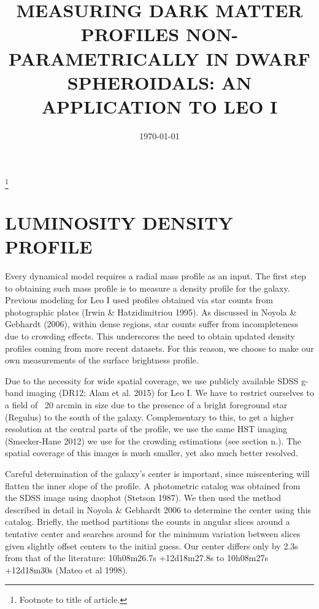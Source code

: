 \documentclass[%
 aip,
 twocolumn,
 jmp,%
 amsmath,amssymb,
 reprint,%
]{aastex61}
\begin{document}

\title[MEASURING DARK MATTER PROFILES NON-PARAMETRICALLY IN DWARF SPHEROIDALS]{MEASURING DARK MATTER PROFILES NON-PARAMETRICALLY IN DWARF SPHEROIDALS:
	AN APPLICATION TO LEO I}%
\thanks{Footnote to title of article.}


\date{\today}%



\section{LUMINOSITY DENSITY PROFILE}

Every dynamical model requires a radial mass profile as an input. The first step to obtaining such mass profile is to measure a density profile for the galaxy. Previous modeling for Leo I used profiles obtained via star counts from photographic plates (Irwin & Hatzidimitriou 1995). As discussed in Noyola \& Gebhardt (2006), within dense regions, star counts suffer from incompleteness due to crowding effects. This underscores the need to obtain updated density profiles coming from more recent datasets. For this reason, we choose to make our own measurements of the surface brightness profile.

Due to the necessity for wide spatial coverage, we use publicly available SDSS g-band imaging (DR12; Alam et al. 2015) for Leo I. We have to restrict ourselves to a field of ~20 arcmin in size due to the presence of a bright foreground star (Regulus) to the south of the galaxy. 
Complementary to this, to get a higher resolution at the central parts of the profile, we use the same HST imaging (Smecker-Hane 2012) we use for the crowding estimations (see section n.). The spatial coverage of this images is much smaller, yet also much better resolved.

Careful determination of the galaxy's center is important, since miscentering will flatten the inner slope of the profile. A photometric catalog was obtained from the SDSS image using daophot (Stetson 1987). We then used the method described in detail in Noyola \& Gebhardt 2006 to determine the center using this catalog.  Briefly, the method partitions the counts in angular slices around a tentative center and searches around for the minimum variation between slices given slightly offset centers to the initial guess. Our center differs only by 2.3s from that of the literature:  10h08m26.7s +12d18m27.8s to 10h08m27s +12d18m30s (Mateo et al 1998).
\end{document}

